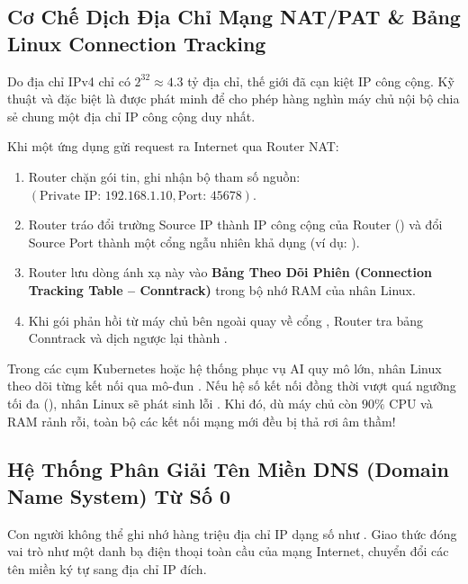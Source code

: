 \subsection{Cơ Chế Dịch Địa Chỉ Mạng NAT/PAT \& Bảng Linux Connection Tracking}
Do địa chỉ IPv4 chỉ có $2^{32} \approx 4.3$ tỷ địa chỉ, thế giới đã cạn kiệt IP công cộng. Kỹ thuật  và đặc biệt là  được phát minh để cho phép hàng nghìn máy chủ nội bộ chia sẻ chung một địa chỉ IP công cộng duy nhất.

Khi một ứng dụng gửi request ra Internet qua Router NAT:
\begin{enumerate}
  \item Router chặn gói tin, ghi nhận bộ tham số nguồn: $(\text{Private IP: 192.168.1.10}, \text{Port: 45678})$.
  \item Router tráo đổi trường Source IP thành IP công cộng của Router () và đổi Source Port thành một cổng ngẫu nhiên khả dụng (ví dụ: ).
  \item Router lưu dòng ánh xạ này vào \textbf{Bảng Theo Dõi Phiên (Connection Tracking Table -- Conntrack)} trong bộ nhớ RAM của nhân Linux.
  \item Khi gói phản hồi từ máy chủ bên ngoài quay về cổng , Router tra bảng Conntrack và dịch ngược lại thành .
\end{enumerate}

\begin{debugbox}
Trong các cụm Kubernetes hoặc hệ thống phục vụ AI quy mô lớn, nhân Linux theo dõi từng kết nối qua mô-đun . Nếu hệ số kết nối đồng thời vượt quá ngưỡng tối đa (), nhân Linux sẽ phát sinh lỗi . Khi đó, dù máy chủ còn $90\%$ CPU và RAM rảnh rỗi, toàn bộ các kết nối mạng mới đều bị thả rơi âm thầm!
\end{debugbox}

\subsection{Hệ Thống Phân Giải Tên Miền DNS (Domain Name System) Từ Số 0}
\label{subsec:dns-from-scratch}
Con người không thể ghi nhớ hàng triệu địa chỉ IP dạng số như . Giao thức  đóng vai trò như một danh bạ điện thoại toàn cầu của mạng Internet, chuyển đổi các tên miền ký tự sang địa chỉ IP đích.

